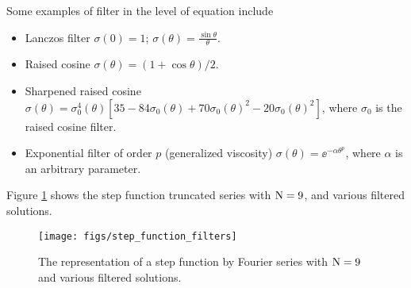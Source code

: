 \documentclass[11pt]{article}
\begin{document}
\begin{enumerate}
    Some examples of filter in the level of equation include
    \begin{itemize}
        \item Lanczos filter
            \subitem $\sigma(0) = 1$;
            \subitem $\sigma(\theta) = \frac{\sin \theta}{\theta}$.
              \item Raised cosine
            \subitem $\sigma(\theta) = (1+\cos\theta)/2$.
        \item Sharpened raised cosine
            \subitem $\sigma(\theta) = \sigma_0^4(\theta)\left[35-84\sigma_0(\theta
                    )+70\sigma_0(\theta)^2 - 20\sigma_0(\theta)^2\right]$,
            \subitem where $\sigma_0$ is the raised cosine filter.
        \item Exponential filter of order $p$ (generalized viscosity)
            \subitem $\sigma(\theta)=\ee^{-\alpha\theta ^p}$,
            \subitem where $\alpha$ is an arbitrary parameter.
    \end{itemize}
    Figure \ref{fig:step_filters} shows the step function truncated series with $\mathrm{N}=9$, and various filtered solutions.

\begin{figure}[ht]
\begin{center}
    \texttt{[image: figs/step\_function\_filters]}
\end{center}
\caption{The representation of a step function by Fourier series with $\mathrm{N}=9$ and various filtered solutions.}
\label{fig:step_filters}
\end{figure}


\end{enumerate}
\end{document}
